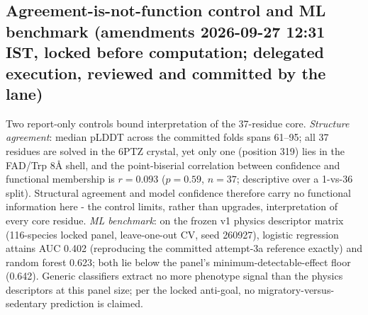 \documentclass[12pt,a4paper]{article}
\begin{document}
\subsection{Agreement-is-not-function control and ML benchmark (amendments 2026-09-27 12:31 IST, locked before computation; delegated execution, reviewed and committed by the lane)}
Two report-only controls bound interpretation of the 37-residue core. \emph{Structure agreement}: median pLDDT across the committed folds spans 61--95; all 37 residues are solved in the 6PTZ crystal, yet only one (position 319) lies in the FAD/Trp 8\AA{} shell, and the point-biserial correlation between confidence and functional membership is $r = 0.093$ ($p = 0.59$, $n = 37$; descriptive over a 1-vs-36 split). Structural agreement and model confidence therefore carry no functional information here - the control limits, rather than upgrades, interpretation of every core residue. \emph{ML benchmark}: on the frozen v1 physics descriptor matrix (116-species locked panel, leave-one-out CV, seed 260927), logistic regression attains AUC 0.402 (reproducing the committed attempt-3a reference exactly) and random forest 0.623; both lie below the panel's minimum-detectable-effect floor (0.642). Generic classifiers extract no more phenotype signal than the physics descriptors at this panel size; per the locked anti-goal, no migratory-versus-sedentary prediction is claimed.
\end{document}
